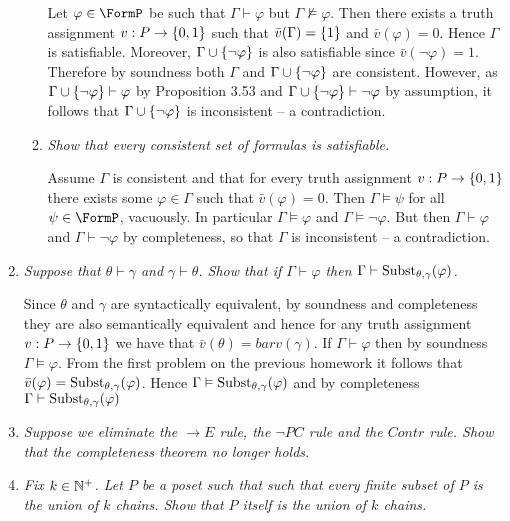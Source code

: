\documentclass[10pt]{article}
\begin{document}
\begin{enumerate}
\begin{enumerate}
Let $\varphi \in \FormP$ be such that $\Gamma \vdash \varphi$ but $\Gamma \not\vDash \varphi$.  Then there exists a truth assignment $v: P \to \left\{ 0,1 \right\}$ such that $\bar{v}(\Gamma) = \left\{ 1 \right\}$ and $\bar{v}(\varphi) = 0$.  Hence $\Gamma$ is satisfiable.  Moreover, $\Gamma \cup \left\{ \neg\varphi \right\}$ is also satisfiable since $\bar{v}(\neg\varphi) = 1$.  Therefore by soundness both $\Gamma$ and $\Gamma \cup \left\{ \neg\varphi \right\}$ are consistent.  However, as $\Gamma \cup \left\{ \neg\varphi \right\} \vdash \varphi$ by Proposition 3.53 and $\Gamma \cup \left\{ \neg\varphi \right\} \vdash \neg\varphi$ by assumption, it follows that $\Gamma \cup \left\{ \neg\varphi \right\}$ is inconsistent -- a contradiction.

\item \emph{Show that every consistent set of formulas is satisfiable.}

Assume $\Gamma$ is consistent and that for every truth assignment $v: P \to \left\{ 0,1 \right\}$ there exists some $\varphi \in \Gamma$ such that $\bar{v}(\varphi) = 0$.  Then $\Gamma \vDash \psi$ for all $\psi \in \FormP$, vacuously.  In particular $\Gamma \vDash \varphi$ and $\Gamma \vDash \neg\varphi$.  But then $\Gamma \vdash \varphi$ and $\Gamma \vdash \neg\varphi$ by completeness, so that $\Gamma$ is inconsistent -- a contradiction.
\end{enumerate}

\item \emph{Suppose that $\theta \vdash \gamma$ and $\gamma \vdash \theta$.  Show that if $\Gamma \vdash \varphi$ then $\Gamma \vdash \operatorname{Subst}_{\theta, \gamma}(\varphi)$.}

Since $\theta$ and $\gamma$ are syntactically equivalent, by soundness and completeness they are also semantically equivalent and hence for any truth assignment $v: P \to \left\{ 0,1 \right\}$ we have that $\bar{v}(\theta) = bar{v}(\gamma)$. If $\Gamma \vdash \varphi$ then by soundness $\Gamma \vDash \varphi$.  From the first problem on the previous homework it follows that $\bar{v}(\varphi) = \operatorname{Subst}_{\theta, \gamma}(\varphi)$.  Hence $\Gamma \vDash \operatorname{Subst}_{\theta, \gamma}(\varphi)$ and by completeness $\Gamma \vdash \operatorname{Subst}_{\theta, \gamma}(\varphi)$

\item \emph{Suppose we eliminate the $\to E$ rule, the $\neg PC$ rule and the $Contr$ rule.  Show that the completeness theorem no longer holds.}

\item \emph{Fix $k \in \mathbb{N}^+$.  Let $P$ be a poset such that such that every finite subset of $P$ is the union of $k$ chains.  Show that $P$ itself is the union of $k$ chains.}


\end{enumerate}
\end{document}
